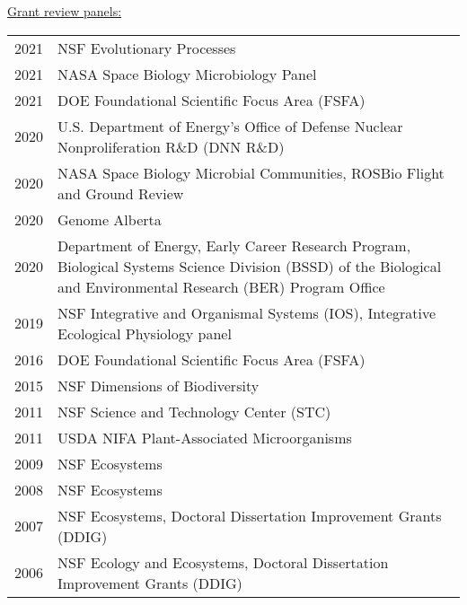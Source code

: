 \documentclass[11pt]{article}
\begin{document}
\vspace{1.5em}
\textnormal{\underline{Grant review panels:}}\\[-1.5em]
\vspace{-0.5em}
\begin{longtable}{@{}p{4em}@{\hspace{2em}}p{}@{}}
2021 & NSF Evolutionary Processes \\
2021 & NASA Space Biology Microbiology Panel \\
2021 & DOE Foundational Scientific Focus Area (FSFA) \\
2020 & U.S. Department of Energy's Office of Defense Nuclear Nonproliferation R\&D (DNN R\&D) \\
2020 & NASA Space Biology Microbial Communities, ROSBio Flight and Ground Review \\
2020 & Genome Alberta \\
2020 & Department of Energy, Early Career Research Program, Biological Systems Science Division (BSSD) of the Biological and Environmental Research (BER) Program Office \\
2019 & NSF Integrative and Organismal Systems (IOS), Integrative Ecological Physiology panel \\
2016 & DOE Foundational Scientific Focus Area (FSFA) \\
2015 & NSF Dimensions of Biodiversity \\
2011 & NSF Science and Technology Center (STC) \\
2011 & USDA NIFA Plant-Associated Microorganisms \\
2009 & NSF Ecosystems \\
2008 & NSF Ecosystems \\
2007 & NSF Ecosystems, Doctoral Dissertation Improvement Grants (DDIG) \\
2006 & NSF Ecology and Ecosystems, Doctoral Dissertation Improvement Grants (DDIG) \\
\end{longtable}
\end{document}
